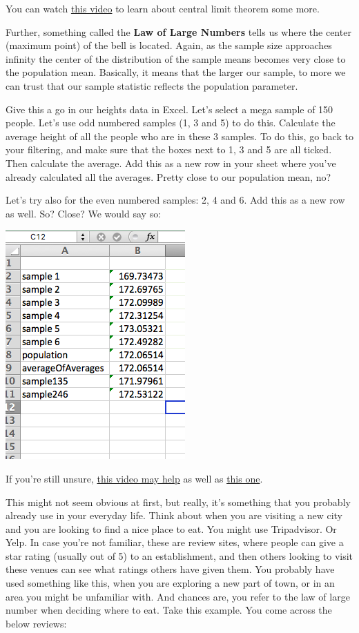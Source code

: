 \documentclass[
]{book}
\begin{document}
You can watch \href{https://www.youtube.com/watch?v=JNm3M9cqWyc}{this video} to learn about central limit theorem some more.

Further, something called the \textbf{Law of Large Numbers} tells us where the center (maximum point) of the bell is located. Again, as the sample size approaches infinity the center of the distribution of the sample means becomes very close to the population mean. Basically, it means that the larger our sample, to more we can trust that our sample statistic reflects the population parameter.

Give this a go in our heights data in Excel. Let's select a mega sample of 150 people. Let's use odd numbered samples (1, 3 and 5) to do this. Calculate the average height of all the people who are in these 3 samples. To do this, go back to your filtering, and make sure that the boxes next to 1, 3 and 5 are all ticked. Then calculate the average. Add this as a new row in your sheet where you've already calculated all the averages. Pretty close to our population mean, no?

Let's try also for the even numbered samples: 2, 4 and 6. Add this as a new row as well. So? Close? We would say so:

\includegraphics{imgs/larger_samples.png}

If you're still unsure, \href{https://www.youtube.com/watch?v=agBcvkyi6sg}{this video may help} as well as \href{https://www.youtube.com/watch?v=iN-77YVqLDw}{this one}.

This might not seem obvious at first, but really, it's something that you probably already use in your everyday life. Think about when you are visiting a new city and you are looking to find a nice place to eat. You might use Tripadvisor. Or Yelp. In case you're not familiar, these are review sites, where people can give a star rating (usually out of 5) to an establishment, and then others looking to visit these venues can see what ratings others have given them. You probably have used something like this, when you are exploring a new part of town, or in an area you might be unfamiliar with. And chances are, you refer to the law of large number when deciding where to eat. Take this example. You come across the below reviews:
\end{document}

